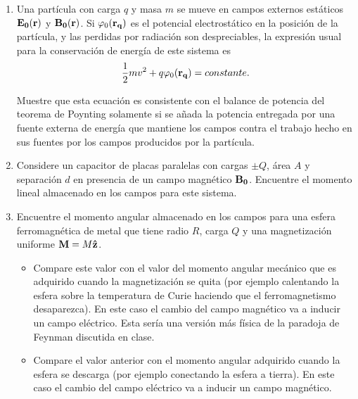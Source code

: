 \documentclass[letterpaper,10pt,onecolumn]{article}
\begin{document}
\begin{enumerate}
\item Una part\'icula con carga $q$ y masa $m$ se mueve en campos
  externos est\'aticos ${\bf E_0(r)}$ y ${\bf B_0(r)}$. Si
  $\varphi_0({\bf r_q})$ es el potencial electrost\'atico en la
  posici\'on de la part\'icula, y las perdidas por radiaci\'on son
  despreciables, la expresi\'on usual para la conservaci\'on de
  energ\'ia de este sistema es 
\begin{displaymath}
\frac{1}{2}mv^2 + q\varphi_0({\bf r_q})=constante.
\end{displaymath}

Muestre que esta ecuaci\'on es consistente con el balance de potencia
del teorema de Poynting solamente si se a\~nada la potencia entregada
por una fuente externa de energ\'ia que mantiene los campos contra el
trabajo hecho en sus fuentes por los campos producidos por la
part\'icula. 

\item
Considere un capacitor de placas paralelas con cargas $\pm Q$, \'area
$A$ y separaci\'on $d$ en presencia de un campo magn\'etico ${\bf
  B_0}$. Encuentre el momento lineal almacenado en los campos para
este sistema. 

\item Encuentre el momento angular almacenado en los campos
  para una esfera ferromagn\'etica de metal que tiene
  radio $R$, carga $Q$ y una magnetizaci\'on uniforme ${\bf M}=M{\bf
    \hat{z}}$. 
  \begin{itemize}
    
  \item Compare este valor con el valor del momento angular mec\'anico
    que es adquirido cuando la magnetizaci\'on se quita (por ejemplo
    calentando la esfera sobre la temperatura de Curie haciendo que el
    ferromagnetismo desaparezca). En este caso el cambio del campo
    magn\'etico va a inducir un campo el\'ectrico. Esta ser\'ia una
    versi\'on m\'as f\'isica de la paradoja de Feynman discutida en
    clase. 
    
  \item Compare el valor anterior con el momento angular adquirido
    cuando la esfera se descarga (por ejemplo conectando la esfera a
    tierra). En este caso el cambio del campo el\'ectrico va a inducir
    un campo magn\'etico. 
  \end{itemize}
  
\end{enumerate}
\end{document}
